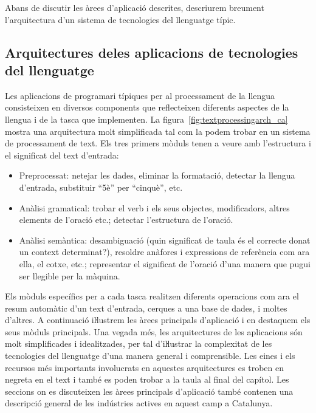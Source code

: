 \begin{multicols}{2}
Abans de discutir les àrees d'aplicació descrites, descriurem breument l'arquitectura d'un sistema de tecnologies del llenguatge típic.

\subsection[Arquitectures de les aplicacions de tecnologies del llenguatge]{Arquitectures de\newline les aplicacions de tecnologies del llenguatge}

Les aplicacions de programari típiques per al processament de la llengua consisteixen en diversos components que reflecteixen diferents aspectes de la llengua i de la tasca que implementen. La figura~\ref{fig:textprocessingarch_ca} mostra una arquitectura molt simplificada tal com la podem trobar en un sistema de processament de text. Els tres primers mòduls tenen a veure amb l’estructura i el significat del text d’entrada:
\begin{itemize}
\item Preprocessat: netejar les dades, eliminar la formatació, detectar la llengua d’entrada, substituir “5è” per “cinquè”, etc.
\item Anàlisi gramatical: trobar el verb i els seus objectes, modificadors, altres elements de l'oració etc.; detectar l’estructura de l’oració.
\item Anàlisi semàntica: desambiguació (quin significat de taula és el correcte donat un context determinat?), resoldre anàfores i expressions de referència com ara ella, el cotxe, etc.; representar el significat de l’oració d’una manera que pugui ser llegible per la màquina.
\end{itemize}


Els mòduls específics per a cada tasca realitzen diferents operacions com ara el resum automàtic d’un text d’entrada, cerques a una base de dades, i moltes d’altres. A continuació iŀlustrem les àrees principals d’aplicació i en destaquem els seus mòduls principals. Una vegada més, les arquitectures de les aplicacions són molt simplificades i idealitzades, per tal d’iŀlustrar la complexitat de les tecnologies del llenguatge d’una manera general i comprensible. Les eines i els recursos més importants involucrats en aquestes arquitectures es troben en negreta en el text i també es poden trobar a la taula al final del capítol. Les seccions on es discuteixen les àrees principals d’aplicació també contenen una descripció general de les indústries actives en aquest camp a Catalunya.


\end{multicols}
